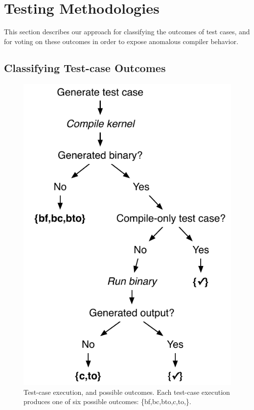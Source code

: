 \section{Testing Methodologies}\label{sec:methodology}

This section describes our approach for classifying the outcomes of test cases, and for voting on these outcomes in order to expose anomalous compiler behavior.


\subsection{Classifying Test-case Outcomes}

\begin{figure}
  \centering %
  \includegraphics[width=.62\columnwidth]{img/test_process}%
  \caption{%
    Test-case execution, and possible outcomes. Each test-case execution produces one of six possible outcomes: \{bf,bc,bto,c,to,\cmark\}.%
  }%
\label{fig:test-process} %
\end{figure}


